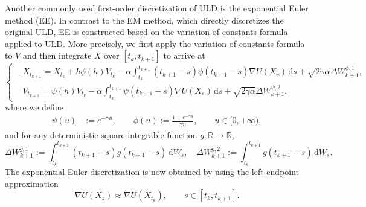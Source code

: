 \documentclass[12pt]{article}
\numberwithin{equation}{section}
\begin{document}

Another commonly used first-order discretization of ULD is the
exponential Euler method (EE). In contrast to the
EM method, which directly discretizes the original
ULD, EE is constructed based on the variation-of-constants formula applied to ULD. 
%
More precisely, we first apply the
variation-of-constants formula to $V$ and then
integrate $X$ over $[t_k,t_{k+1}]$ to arrive at
\begin{equation}
\label{eq:intro-ex-ULD}
\left\{
\begin{aligned}
    &X_{t_{k+1}}
    =
    X_{t_k}
    +
    h\phi(h)V_{t_k}
    - 
    \alpha
    \int^{t_{k+1}}_{t_k} (t_{k+1}-s)
    \phi(t_{k+1}-s)
    \nabla U(X_s)\, \mathrm{d}s
    +
    \sqrt{2\gamma\alpha}
    \Delta W_{k+1}^{\phi,1},  \\
    &V_{t_{k+1}}
    =
    \psi(h)V_{t_k}
    -
    \alpha
    \int^{t_{k+1}}_{t_k}
    \psi(t_{k+1}-s)
    \nabla U(X_s) \, \mathrm{d}s
    +
    \sqrt{2\gamma\alpha}
    \Delta W_{k+1}^{\psi,2},
\end{aligned}
\right.
\end{equation}
where we define
\begin{align}
\label{eq:define-psi-phi}
\psi(u) &:=
e^{-\gamma u},
\qquad 
\phi(u) :=
\tfrac{1-e^{-\gamma u}}{\gamma u},
\qquad u\in [0,+\infty),
\end{align}
and for any deterministic square-integrable function $g\colon \mathbb{R}\to \mathbb{R}$,
\begin{equation}
\label{eq:define-Delta-W}
\Delta W_{k+1}^{g,1}
:=
\int^{t_{k+1}}_{t_k}
(t_{k+1}-s)
g(t_{k+1}-s) \,\mathrm{d}W_{s},
\quad 
\Delta W_{k+1}^{g,2}
:=
\int^{t_{k+1}}_{t_k}
g (t_{k+1}-s) \,\mathrm{d}W_{s}.
\end{equation}
%
%
%
The exponential Euler discretization is now obtained 
by using the left-endpoint approximation
\[
\nabla U(X_s)
\approx
\nabla U(X_{t_k}),
\qquad
s\in[t_k,t_{k+1}].
\]
\end{document}

